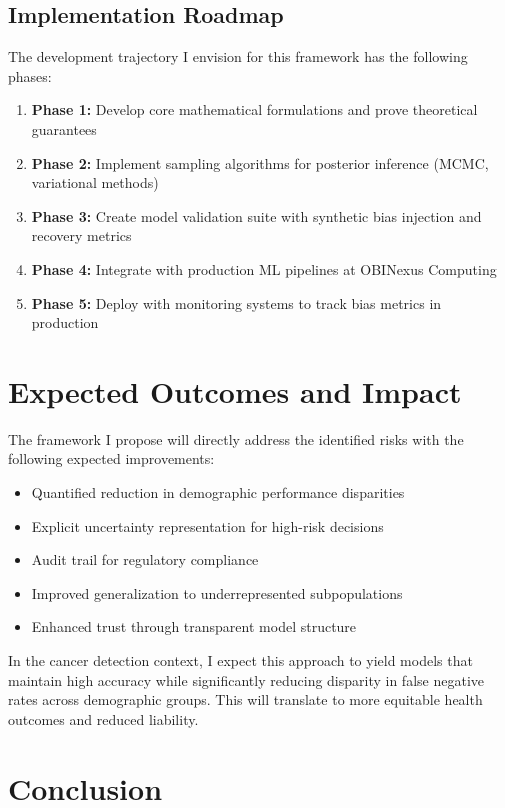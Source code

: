 \documentclass[12pt]{article}
\begin{document}
\subsection{Implementation Roadmap}

The development trajectory I envision for this framework has the following phases:

\begin{enumerate}
    \item \textbf{Phase 1:} Develop core mathematical formulations and prove theoretical guarantees
    \item \textbf{Phase 2:} Implement sampling algorithms for posterior inference (MCMC, variational methods)
    \item \textbf{Phase 3:} Create model validation suite with synthetic bias injection and recovery metrics
    \item \textbf{Phase 4:} Integrate with production ML pipelines at OBINexus Computing
    \item \textbf{Phase 5:} Deploy with monitoring systems to track bias metrics in production
\end{enumerate}

\section{Expected Outcomes and Impact}

The framework I propose will directly address the identified risks with the following expected improvements:

\begin{itemize}
    \item Quantified reduction in demographic performance disparities
    \item Explicit uncertainty representation for high-risk decisions
    \item Audit trail for regulatory compliance
    \item Improved generalization to underrepresented subpopulations
    \item Enhanced trust through transparent model structure
\end{itemize}

In the cancer detection context, I expect this approach to yield models that maintain high accuracy while significantly reducing disparity in false negative rates across demographic groups. This will translate to more equitable health outcomes and reduced liability.

\section{Conclusion}
\end{document}
